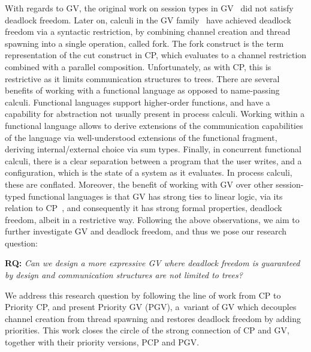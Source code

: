 \documentclass[main.tex]{subfiles}
\begin{document}
With regards to GV, the original work on session types in GV~\cite{gayvasconcelos10,gayvasconcelos12} did not satisfy deadlock freedom. Later on, calculi in the GV family~\cite{wadler15,lindleymorris15} have achieved deadlock freedom via a syntactic restriction, \ie by combining channel creation and thread spawning into a single operation, called fork. The fork construct is the term representation of the cut construct in CP, which evaluates to a channel restriction combined with a parallel composition. Unfortunately, as with CP, this is restrictive as it limits communication structures to trees. There are several benefits of working with a functional language as opposed to name-passing calculi. Functional languages support higher-order functions, and have a capability for abstraction not usually present in process calculi. Working within a functional language allows to derive extensions of the communication capabilities of the language via well-understood extensions of the functional fragment, \ie deriving internal/external choice via sum types. Finally, in concurrent functional calculi, there is a clear separation between a program that the user writes, and a configuration, which is the state of a system as it evaluates. In process calculi, these are conflated.
Moreover, the benefit of working with GV over other session-typed functional languages is that GV has strong ties to linear logic, via its relation to CP~\cite{wadler14}, and consequently it has strong formal properties, \eg deadlock freedom, albeit in a restrictive way.
Following the above observations, we aim to further investigate GV and deadlock freedom, and thus we pose our research question:

\textbf{RQ:} \emph{Can we design a more expressive GV where deadlock freedom is guaranteed by design and communication structures are not limited to trees?}

We address this research question by following the line of work from CP to Priority CP, and present
Priority GV (PGV), a~variant of GV which decouples channel creation from thread spawning and restores deadlock freedom by adding priorities. This work closes the circle of the strong connection of CP and GV, together with their priority versions, PCP and PGV.
\end{document}
